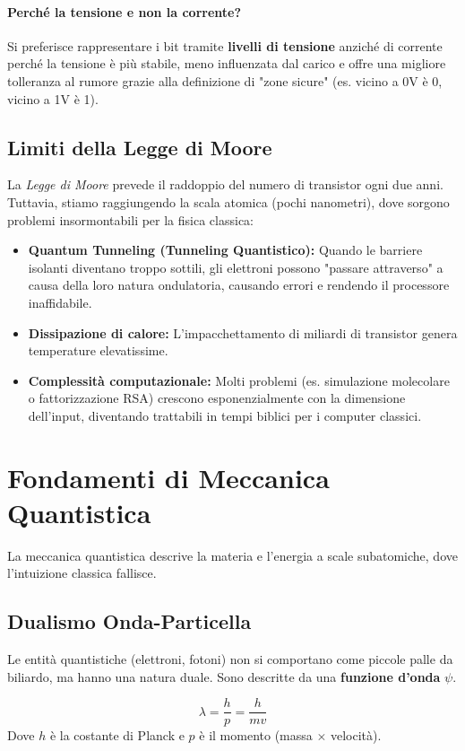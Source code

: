 \documentclass[12pt, a4paper]{article}
\begin{document}
\paragraph{Perché la tensione e non la corrente?}
Si preferisce rappresentare i bit tramite \textbf{livelli di tensione} anziché di corrente perché la tensione è più stabile, meno influenzata dal carico e offre una migliore tolleranza al rumore grazie alla definizione di "zone sicure" (es. vicino a 0V è 0, vicino a 1V è 1).

\subsection{Limiti della Legge di Moore}
La \textit{Legge di Moore} prevede il raddoppio del numero di transistor ogni due anni. Tuttavia, stiamo raggiungendo la scala atomica (pochi nanometri), dove sorgono problemi insormontabili per la fisica classica:
\begin{itemize}
    \item \textbf{Quantum Tunneling (Tunneling Quantistico):} Quando le barriere isolanti diventano troppo sottili, gli elettroni possono "passare attraverso" a causa della loro natura ondulatoria, causando errori e rendendo il processore inaffidabile.
    \item \textbf{Dissipazione di calore:} L'impacchettamento di miliardi di transistor genera temperature elevatissime.
    \item \textbf{Complessità computazionale:} Molti problemi (es. simulazione molecolare o fattorizzazione RSA) crescono esponenzialmente con la dimensione dell'input, diventando trattabili in tempi biblici per i computer classici.
\end{itemize}

\section{Fondamenti di Meccanica Quantistica}
La meccanica quantistica descrive la materia e l'energia a scale subatomiche, dove l'intuizione classica fallisce.

\subsection{Dualismo Onda-Particella}
Le entità quantistiche (elettroni, fotoni) non si comportano come piccole palle da biliardo, ma hanno una natura duale. Sono descritte da una \textbf{funzione d'onda} $\psi$.

\begin{tcolorbox}[title=Lunghezza d'onda di De Broglie]
\[
\lambda = \frac{h}{p} = \frac{h}{mv}
\]
Dove $h$ è la costante di Planck e $p$ è il momento (massa $\times$ velocità).
\end{tcolorbox}
\end{document}
